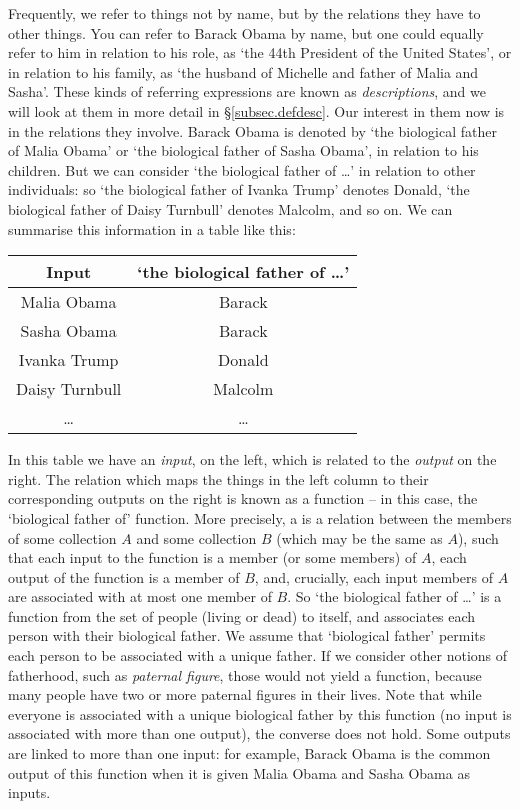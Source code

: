 Frequently, we refer to things not by name, but by the relations they have to other things. You can refer to Barack Obama by name, but one could equally refer to him in relation to his role, as `the 44th President of the United States', or in relation to his family, as `the husband of Michelle and father of Malia and Sasha'. These kinds of referring expressions are known as \emph{descriptions}, and we will look at them in more detail in §\ref{subsec.defdesc}. Our interest in them now is in the relations they involve. Barack Obama is denoted by `the biological father of Malia Obama' or `the biological father of Sasha Obama', in relation to his children. But we can consider `the biological father of …' in relation to other individuals: so `the biological father of Ivanka Trump' denotes Donald, `the biological father of Daisy Turnbull' denotes Malcolm, and so on. We can summarise this information in a table like this: 
\begin{center}
\begin{tabular}{c|c} \toprule 
Input & `the biological father of …'\\
\midrule
Malia Obama & Barack \\
Sasha Obama & Barack \\
Ivanka Trump & Donald\\
Daisy Turnbull & Malcolm\\
… & … \\ \bottomrule
\end{tabular}
\end{center} In this table we have an \emph{input}, on the left, which is related to the \emph{output} on the right. The relation which maps the things in the left column to their corresponding outputs on the right is known as a function – in this case, the `biological father of' function. More precisely, a  is a relation between the members of some collection $A$ and some collection $B$ (which may be the same as $A$), such that each input to the function is a member (or some members) of $A$, each output of the function is a member of $B$, and, crucially, each input members of $A$ are associated with at most one member of $B$. So `the biological father of …' is a function from the set of people (living or dead) to itself, and associates each person with their biological father. We assume that `biological father' permits each person to be associated with a unique father. If we consider other notions of fatherhood, such as \emph{paternal figure}, those would not yield a function, because many people have two or more paternal figures in their lives. Note that while everyone is associated with a unique biological father by this function (no input is associated with more than one output), the converse does not hold. Some outputs are linked to more than one input: for example, Barack Obama is the common output of this function when it is given Malia Obama and Sasha Obama as inputs.

